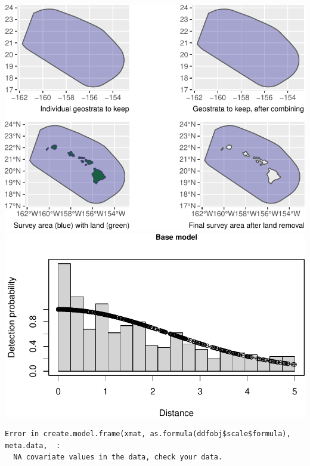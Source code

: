 \documentclass[
]{book}
\begin{document}
\includegraphics{figures/unnamed-chunk-177-1.pdf} \includegraphics{figures/unnamed-chunk-177-2.pdf}

\begin{verbatim}
Error in create.model.frame(xmat, as.formula(ddfobj$scale$formula), meta.data,  : 
  NA covariate values in the data, check your data.
\end{verbatim}
\end{document}
